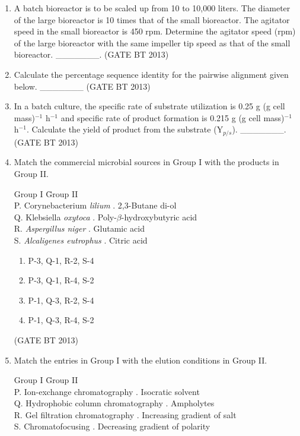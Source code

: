 \documentclass[journal,12pt,onecolumn]{IEEEtran}
\theoremstyle{remark}
\begin{document}
\begin{enumerate}
\item 

A batch bioreactor is to be scaled up from 10 to 10,000 liters. The diameter of the large bioreactor is 10 times that of the small bioreactor. The agitator speed in the small bioreactor is 450 rpm. Determine the agitator speed (rpm) of the large bioreactor with the same impeller tip speed as that of the small bioreactor. \_\_\_\_\_\_\_.
\hfill (GATE BT 2013)
\item 

Calculate the percentage sequence identity for the pairwise alignment given below. \_\_\_\_\_\_\_
\hfill (GATE BT 2013)
\item 

In a batch culture, the specific rate of substrate utilization is 0.25 g (g cell mass)$^{-1}$ h$^{-1}$ and specific rate of product formation is 0.215 g (g cell mass)$^{-1}$ h$^{-1}$. Calculate the yield of product from the substrate (Y$_{p/s}$). \_\_\_\_\_\_\_.
\hfill (GATE BT 2013)
\item 

Match the commercial microbial sources in Group I with the products in Group II.

\begin{tabbing}
Group I \hspace{3cm} \= Group II \\
P. Corynebacterium \textit{lilium} . 2,3-Butane di-ol \\
Q. Klebsiella \textit{oxytoca} . Poly-$\beta$-hydroxybutyric acid \\
R. \textit{Aspergillus niger} . Glutamic acid \\
S. \textit{Alcaligenes eutrophus} . Citric acid \\
\end{tabbing}

\begin{enumerate}
    \item P-3, Q-1, R-2, S-4
    \item P-3, Q-1, R-4, S-2
    \item P-1, Q-3, R-2, S-4
    \item P-1, Q-3, R-4, S-2
\end{enumerate} 
\hfill (GATE BT 2013)
\item 

Match the entries in Group I with the elution conditions in Group II.

\begin{tabbing}
Group I \hspace{6cm} \= Group II \\
P. Ion-exchange chromatography . Isocratic solvent \\
Q. Hydrophobic column chromatography . Ampholytes \\
R. Gel filtration chromatography . Increasing gradient of salt \\
S. Chromatofocusing . Decreasing gradient of polarity \\
\end{tabbing}


\end{enumerate}
\end{document}
